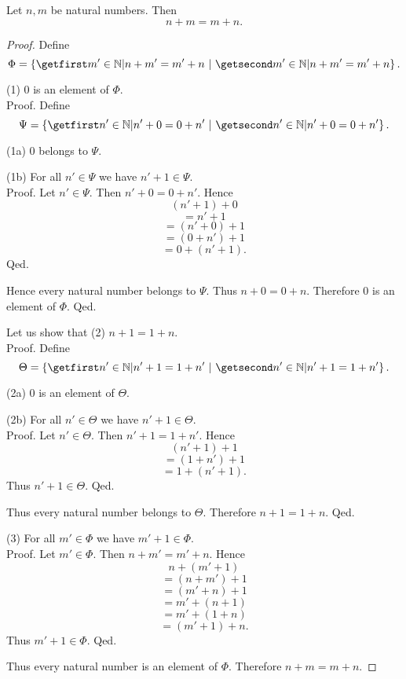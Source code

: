 \documentclass[../arithmetic.tex]{subfiles}
\begin{document}
  \begin{forthel}
    \begin{proposition}
      Let $n, m$ be natural numbers.
      Then \[ n + m = m + n. \]
    \end{proposition}
    \begin{proof}
      Define \[ \Phi = \class{m' \in \Nat | n + m' = m' + n}. \]

      (1) $0$ is an element of $\Phi$. \\
      Proof.
        Define \[ \Psi = \class{n' \in \Nat | n' + 0 = 0 + n'}. \]

        (1a) $0$ belongs to $\Psi$.

        (1b) For all $n' \in \Psi$ we have $n' + 1 \in \Psi$. \\
        Proof.
          Let $n' \in \Psi$.
          Then $n' + 0 = 0 + n'$.
          Hence
          \[  (n' + 1) + 0        \]
          \[    = n' + 1          \]
          \[    = (n' + 0) + 1    \]
          \[    = (0 + n') + 1    \]
          \[    = 0 + (n' + 1).   \]
        Qed.

        Hence every natural number belongs to $\Psi$.
        Thus $n + 0 = 0 + n$.
        Therefore $0$ is an element of $\Phi$.
      Qed.

      Let us show that (2) $n + 1 = 1 + n$. \\
      Proof.
        Define \[ \Theta = \class{n' \in \Nat | n' + 1 = 1 + n'}. \]

        (2a) $0$ is an element of $\Theta$.

        (2b) For all $n' \in \Theta$ we have $n' + 1 \in \Theta$. \\
        Proof.
          Let $n' \in \Theta$.
          Then $n' + 1 = 1 + n'$.
          Hence
          \[  (n' + 1) + 1        \]
          \[    = (1 + n') + 1    \]
          \[    = 1 + (n' + 1).   \]
          Thus $n' + 1 \in \Theta$.
        Qed.

        Thus every natural number belongs to $\Theta$.
        Therefore $n + 1 = 1 + n$.
      Qed.

      (3) For all $m' \in \Phi$ we have $m' + 1 \in \Phi$. \\
      Proof.
        Let $m' \in \Phi$.
        Then $n + m' = m' + n$.
        Hence
        \[  n + (m'  + 1)       \]
        \[    = (n + m') + 1    \]
        \[    = (m' + n) + 1    \]
        \[    = m' + (n + 1)    \]
        \[    = m' + (1 + n)    \]
        \[    = (m' + 1) + n.   \]
        Thus $m' + 1 \in \Phi$.
      Qed.

      Thus every natural number is an element of $\Phi$.
      Therefore $n + m = m + n$.
    \end{proof}
  \end{forthel}
\end{document}
